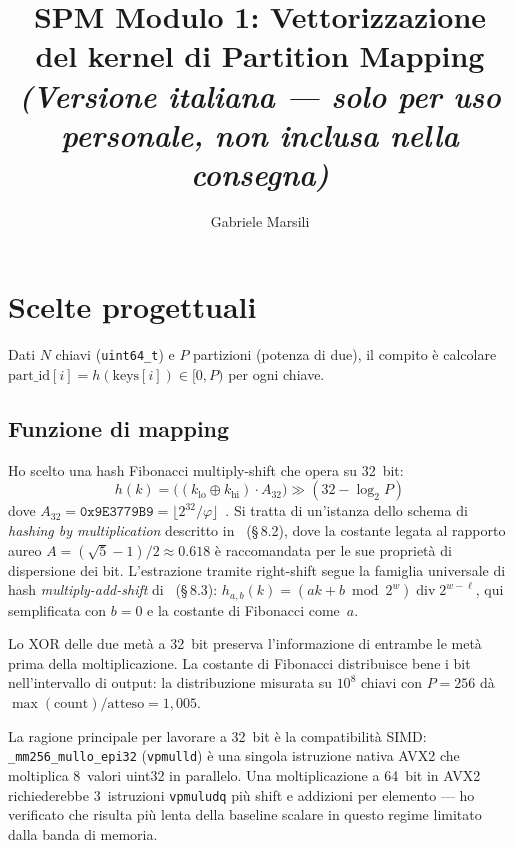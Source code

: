 \documentclass[10pt,a4paper,twocolumn]{article}
\title{\vspace{-1.5em}\textbf{SPM Modulo 1: Vettorizzazione del kernel di Partition Mapping}\\\small\textit{(Versione italiana --- solo per uso personale, non inclusa nella consegna)}\vspace{-0.5em}}
\author{Gabriele Marsili}
\date{}
\begin{document}
\maketitle
\vspace{-1.5em}

\section{Scelte progettuali}

Dati $N$ chiavi (\texttt{uint64\_t}) e $P$ partizioni (potenza di due), il compito è calcolare $\text{part\_id}[i] = h(\text{keys}[i]) \in [0,P)$ per ogni chiave.

\subsection{Funzione di mapping}

Ho scelto una hash Fibonacci multiply-shift che opera su 32~bit:
$$h(k) = \bigl((k_\text{lo} \oplus k_\text{hi}) \cdot A_{32}\bigr) \gg (32 - \log_2 P)$$
dove $A_{32} = \texttt{0x9E3779B9} = \lfloor 2^{32}/\varphi \rfloor$~\cite{knuth1998}.
Si tratta di un'istanza dello schema di \emph{hashing by multiplication} descritto in~\cite{ferragina2023} (\S\,8.2), dove la costante legata al rapporto aureo $A = (\sqrt{5}-1)/2 \approx 0.618$ è raccomandata per le sue proprietà di dispersione dei bit. L'estrazione tramite right-shift segue la famiglia universale di hash \emph{multiply-add-shift} di~\cite{ferragina2023} (\S\,8.3): $h_{a,b}(k)=(ak+b \bmod 2^w) \operatorname{div} 2^{w-\ell}$, qui semplificata con $b\!=\!0$ e la costante di Fibonacci come~$a$.

Lo XOR delle due metà a 32~bit preserva l'informazione di entrambe le metà prima della moltiplicazione. La costante di Fibonacci distribuisce bene i bit nell'intervallo di output: la distribuzione misurata su $10^8$ chiavi con $P\!=\!256$ dà $\max(\text{count})/\text{atteso} = 1{,}005$.

La ragione principale per lavorare a 32~bit è la compatibilità SIMD: \texttt{\_mm256\_mullo\_epi32} (\texttt{vpmulld}) è una singola istruzione nativa AVX2 che moltiplica 8~valori uint32 in parallelo. Una moltiplicazione a 64~bit in AVX2 richiederebbe 3~istruzioni \texttt{vpmuludq} più shift e addizioni per elemento --- ho verificato che risulta più lenta della baseline scalare in questo regime limitato dalla banda di memoria.
\end{document}
